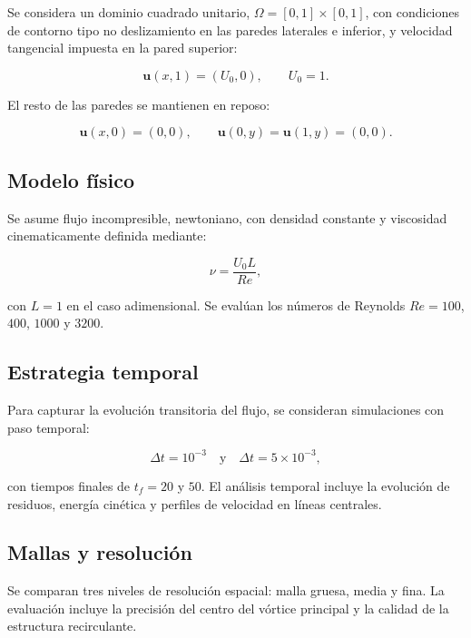 \documentclass[11pt]{article}
\begin{document}
Se considera un dominio cuadrado unitario, $\Omega = [0,1]\times[0,1]$, con condiciones de contorno tipo no deslizamiento en las paredes laterales e inferior, y velocidad tangencial impuesta en la pared superior:

\begin{equation}
\mathbf{u}(x,1) = (U_0, 0), \qquad U_0 = 1.
\end{equation}

El resto de las paredes se mantienen en reposo:

\begin{equation}
\mathbf{u}(x,0) = (0,0), \qquad \mathbf{u}(0,y) = \mathbf{u}(1,y) = (0,0).
\end{equation}

\subsection{Modelo físico}

Se asume flujo incompresible, newtoniano, con densidad constante y viscosidad cinematicamente definida mediante:

\begin{equation}
\nu = \frac{U_0 L}{Re},
\end{equation}

con $L=1$ en el caso adimensional. Se evalúan los números de Reynolds $Re = 100$, $400$, $1000$ y $3200$.

\subsection{Estrategia temporal}

Para capturar la evolución transitoria del flujo, se consideran simulaciones con paso temporal:

\begin{equation}
\Delta t = 10^{-3} \quad \text{y} \quad \Delta t = 5\times 10^{-3},
\end{equation}

con tiempos finales de $t_f = 20$ y $50$. El análisis temporal incluye la evolución de residuos, energía cinética y perfiles de velocidad en líneas centrales.

\subsection{Mallas y resolución}

Se comparan tres niveles de resolución espacial: malla gruesa, media y fina. La evaluación incluye la precisión del centro del vórtice principal y la calidad de la estructura recirculante.
\end{document}
